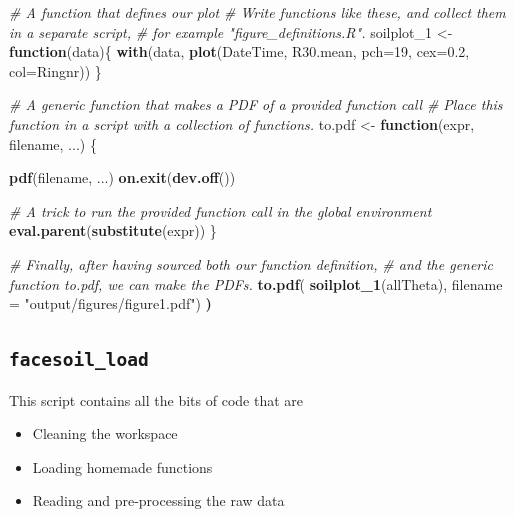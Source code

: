 \documentclass[]{book}
\newenvironment{Shaded}{\begin{snugshade}}{\end{snugshade}}
\newcommand{\CommentTok}[1]{\textcolor[rgb]{0.56,0.35,0.01}{\textit{#1}}}
\newcommand{\ControlFlowTok}[1]{\textcolor[rgb]{0.13,0.29,0.53}{\textbf{#1}}}
\newcommand{\DataTypeTok}[1]{\textcolor[rgb]{0.13,0.29,0.53}{#1}}
\newcommand{\DecValTok}[1]{\textcolor[rgb]{0.00,0.00,0.81}{#1}}
\newcommand{\ErrorTok}[1]{\textcolor[rgb]{0.64,0.00,0.00}{\textbf{#1}}}
\newcommand{\FloatTok}[1]{\textcolor[rgb]{0.00,0.00,0.81}{#1}}
\newcommand{\KeywordTok}[1]{\textcolor[rgb]{0.13,0.29,0.53}{\textbf{#1}}}
\newcommand{\NormalTok}[1]{#1}
\newcommand{\StringTok}[1]{\textcolor[rgb]{0.31,0.60,0.02}{#1}}
\providecommand{\tightlist}{%
  \setlength{\itemsep}{0pt}\setlength{\parskip}{0pt}}
\begin{document}
\begin{Shaded}
\begin{Highlighting}[]
\CommentTok{# A function that defines our plot}
\CommentTok{# Write functions like these, and collect them in a separate script,}
\CommentTok{# for example "figure_definitions.R".}
\NormalTok{soilplot_}\DecValTok{1}\NormalTok{ <-}\StringTok{ }\ControlFlowTok{function}\NormalTok{(data)\{}
  \KeywordTok{with}\NormalTok{(data, }\KeywordTok{plot}\NormalTok{(DateTime, R30.mean, }\DataTypeTok{pch=}\DecValTok{19}\NormalTok{, }\DataTypeTok{cex=}\FloatTok{0.2}\NormalTok{,}
                    \DataTypeTok{col=}\NormalTok{Ringnr))  }
\NormalTok{\}}

\CommentTok{# A generic function that makes a PDF of a provided function call}
\CommentTok{# Place this function in a script with a collection of functions.}
\NormalTok{to.pdf <-}\StringTok{ }\ControlFlowTok{function}\NormalTok{(expr, filename, ...) \{}
  
  \KeywordTok{pdf}\NormalTok{(filename, ...)}
  \KeywordTok{on.exit}\NormalTok{(}\KeywordTok{dev.off}\NormalTok{())}
  
  \CommentTok{# A trick to run the provided function call in the global environment}
  \KeywordTok{eval.parent}\NormalTok{(}\KeywordTok{substitute}\NormalTok{(expr))}
\NormalTok{\}}


\CommentTok{# Finally, after having sourced both our function definition, }
\CommentTok{# and the generic function to.pdf, we can make the PDFs.}
\KeywordTok{to.pdf}\NormalTok{(}
  \KeywordTok{soilplot_1}\NormalTok{(allTheta), }
  \DataTypeTok{filename =} \StringTok{"output/figures/figure1.pdf"}\NormalTok{)}
\ErrorTok{)}
\end{Highlighting}
\end{Shaded}

\hypertarget{facesoil_load}{%
\subsection{\texorpdfstring{\texttt{facesoil\_load}}{facesoil\_load}}\label{facesoil_load}}

This script contains all the bits of code that are

\begin{itemize}
\tightlist
\item
  Cleaning the workspace
\item
  Loading homemade functions
\item
  Reading and pre-processing the raw data
\end{itemize}
\end{document}
